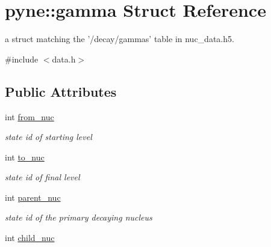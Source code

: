 \hypertarget{structpyne_1_1gamma}{\section{pyne\+:\+:gamma Struct Reference}
\label{structpyne_1_1gamma}
}


a struct matching the '/decay/gammas' table in nuc\+\_\+data.\+h5.  




{\ttfamily \#include $<$data.\+h$>$}

\subsection*{Public Attributes}
\begin{DoxyCompactItemize}
\item 
\hypertarget{structpyne_1_1gamma_a1c5b7ef9f75c628193a0872c9ae172e4}{int \hyperlink{structpyne_1_1gamma_a1c5b7ef9f75c628193a0872c9ae172e4}{from\+\_\+nuc}}\label{structpyne_1_1gamma_a1c5b7ef9f75c628193a0872c9ae172e4}

\begin{DoxyCompactList}\small\item\em state id of starting level \end{DoxyCompactList}\item 
\hypertarget{structpyne_1_1gamma_af9ed390289a667c82464c859dbccb0a4}{int \hyperlink{structpyne_1_1gamma_af9ed390289a667c82464c859dbccb0a4}{to\+\_\+nuc}}\label{structpyne_1_1gamma_af9ed390289a667c82464c859dbccb0a4}

\begin{DoxyCompactList}\small\item\em state id of final level \end{DoxyCompactList}\item 
\hypertarget{structpyne_1_1gamma_a947386fa2557f57cc14f79d6904185bd}{int \hyperlink{structpyne_1_1gamma_a947386fa2557f57cc14f79d6904185bd}{parent\+\_\+nuc}}\label{structpyne_1_1gamma_a947386fa2557f57cc14f79d6904185bd}

\begin{DoxyCompactList}\small\item\em state id of the primary decaying nucleus \end{DoxyCompactList}\item 
\hypertarget{structpyne_1_1gamma_a99fcb3ccd78db851f7104ff3ab59048d}{int \hyperlink{structpyne_1_1gamma_a99fcb3ccd78db851f7104ff3ab59048d}{child\+\_\+nuc}}\label{structpyne_1_1gamma_a99fcb3ccd78db851f7104ff3ab59048d}


\end{DoxyCompactItemize}
